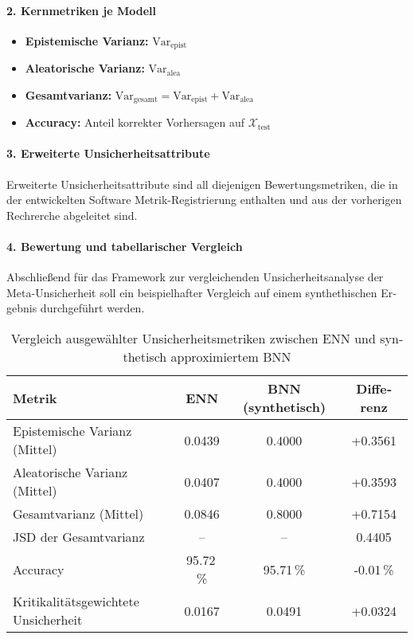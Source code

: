 \begin{otherlanguage}{ngerman}
{%

\paragraph{2. Kernmetriken je Modell}

\begin{itemize}
    \item \textbf{Epistemische Varianz:} \( \text{Var}_{\text{epist}} \)
    \item \textbf{Aleatorische Varianz:} \( \text{Var}_{\text{alea}} \)
    \item \textbf{Gesamtvarianz:} \( \text{Var}_{\text{gesamt}} = \text{Var}_{\text{epist}} + \text{Var}_{\text{alea}} \)
    \item \textbf{Accuracy:} Anteil korrekter Vorhersagen auf \( \mathcal{X}_{\text{test}} \)
\end{itemize}

\paragraph{3. Erweiterte Unsicherheitsattribute} Erweiterte Unsicherheitsattribute sind all diejenigen Bewertungsmetriken, die in der entwickelten Software Metrik-Registrierung enthalten und aus der vorherigen Rechrerche abgeleitet sind.

\paragraph{4. Bewertung und tabellarischer Vergleich} Abschließend für das Framework zur vergleichenden Unsicherheitsanalyse der Meta-Unsicherheit soll ein beispielhafter Vergleich auf einem synthethischen Ergebnis durchgeführt werden.

\begin{table}[h]
\centering
\begin{tabular}{|l|c|c|c|}
\hline
\textbf{Metrik} & \textbf{ENN} & \textbf{BNN (synthetisch)} & \textbf{Differenz} \\
\hline
Epistemische Varianz (Mittel)           & 0.0439 & 0.4000 & +0.3561 \\
Aleatorische Varianz (Mittel)           & 0.0407 & 0.4000 & +0.3593 \\
Gesamtvarianz (Mittel)                  & 0.0846 & 0.8000 & +0.7154 \\
JSD der Gesamtvarianz                   & --     & --     & 0.4405  \\
Accuracy                                & 95.72\,\% & 95.71\,\% & -0.01\,\% \\
Kritikalitätsgewichtete Unsicherheit    & 0.0167 & 0.0491 & +0.0324 \\
\hline
\end{tabular}
\caption{Vergleich ausgewählter Unsicherheitsmetriken zwischen ENN und synthetisch approximiertem BNN}
\end{table}

}
\end{otherlanguage}
